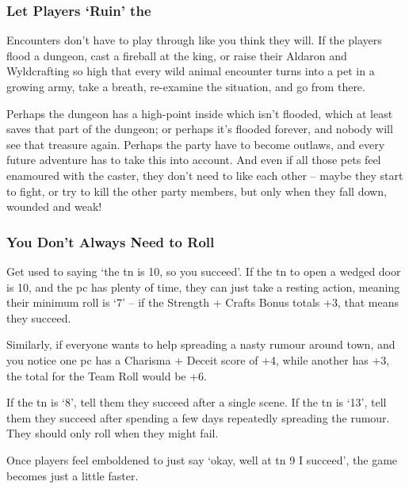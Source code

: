 \begin{multicols}{2}
\subsubsection{Let Players `Ruin' the }

Encounters don't have to play through like you think they will.
If the players flood a dungeon, cast a fireball at the king, or raise their Aldaron and Wyldcrafting so high that every wild animal encounter turns into a pet in a growing army, take a breath, re-examine the situation, and go from there.

Perhaps the dungeon has a high-point inside which isn't flooded, which at least saves that part of the dungeon; or perhaps it's flooded forever, and nobody will see that treasure again.
Perhaps the party have to become outlaws, and every future adventure has to take this into account.
And even if all those pets feel enamoured with the caster, they don't need to like each other -- maybe they start to fight, or try to kill the other party members, but only when they fall down, wounded and weak!

\subsubsection{You Don't Always Need to Roll}

Get used to saying `the \gls{tn} is 10, so you succeed'.
If the \gls{tn} to open a wedged door is 10, and the \gls{pc} has plenty of time, they can just take a resting action, meaning their minimum roll is `7' -- if the Strength + Crafts Bonus totals +3, that means they succeed.

Similarly, if everyone wants to help spreading a nasty rumour around town, and you notice one \gls{pc} has a Charisma + Deceit score of +4, while another has +3, the total for the Team Roll would be +6.

If the \gls{tn} is `8', tell them they succeed after a single scene.
If the \gls{tn} is `13', tell them they succeed after spending a few days repeatedly spreading the rumour.
They should only roll when they might fail.

Once players feel emboldened to just say `okay, well at \gls{tn} 9 I succeed', the game becomes just a little faster.

\subsection{}


\end{multicols}
